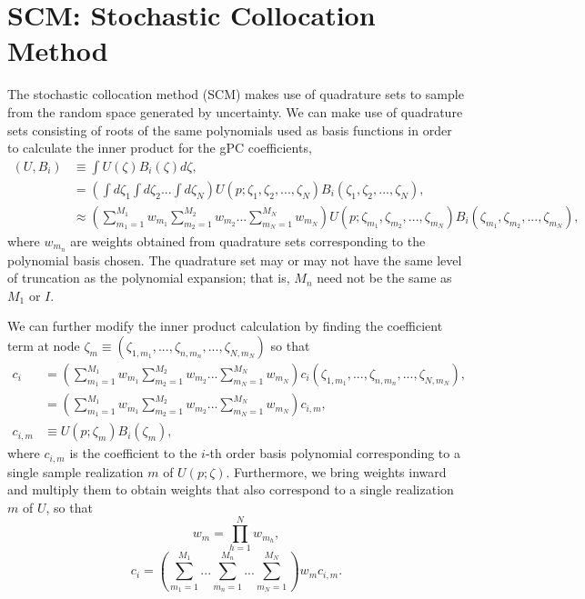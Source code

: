 \section{SCM: Stochastic Collocation Method}
The stochastic collocation method (SCM) makes use of quadrature sets to sample from the random space generated by uncertainty.  We can make use of quadrature sets consisting of roots of the same polynomials used as basis functions in order to calculate the inner product for the gPC coefficients,
\begin{align}
(U,B_i)&\equiv\int U(\zeta) B_i(\zeta)d\zeta, \\
  &=\left( \int d\zeta_1 \int d\zeta_2 ... \int d\zeta_N\right)
        U(p;\zeta_1,\zeta_2,...,\zeta_N)B_i(\zeta_1,\zeta_2,...,\zeta_N), \\
 &\approx\left(\sum_{m_1=1}^{M_1}w_{m_1}\sum_{m_2=1}^{M_2}w_{m_2}...\sum_{m_N=1}^{M_N}w_{m_N}\right)
        U(p;\zeta_{m_1},\zeta_{m_2},...,\zeta_{m_N})B_i(\zeta_{m_1},\zeta_{m_2},...,\zeta_{m_N}),
\end{align}
where $w_{m_n}$ are weights obtained from quadrature sets corresponding to the polynomial basis chosen.  The quadrature set may or may not have the same level of truncation as the polynomial expansion; that is, $M_n$ need not be the same as $M_1$ or $I$.

We can further modify the inner product calculation by finding the coefficient term at node $\zeta_m\equiv(\zeta_{1,m_1},...,\zeta_{n,m_n},...,\zeta_{N,m_N})$ so that
\begin{align}
c_i&=\left(\sum_{m_1=1}^{M_1}w_{m_1}\sum_{m_2=1}^{M_2}w_{m_2}...\sum_{m_N=1}^{M_N}w_{m_N}\right)
        c_i(\zeta_{1,m_1},...,\zeta_{n,m_n},...,\zeta_{N,m_N}),\\
  &= \left(\sum_{m_1=1}^{M_1}w_{m_1}\sum_{m_2=1}^{M_2}w_{m_2}...\sum_{m_N=1}^{M_N}w_{m_N}\right)
        c_{i,m},\\
c_{i,m}&\equiv U(p;\zeta_m)B_i(\zeta_m),
\end{align}
where $c_{i,m}$ is the coefficient to the $i$-th order basis polynomial corresponding to a single sample realization $m$ of $U(p;\zeta)$.  Furthermore, we bring weights inward and multiply them to obtain weights that also correspond to a single realization $m$ of $U$, so that
\begin{equation}
w_m=\prod_{h=1}^N w_{m_h},
\end{equation}
\begin{equation}
c_i=\left(\sum_{m_1=1}^{M_1}...\sum_{m_n=1}^{M_n}...\sum_{m_N=1}^{M_N}\right)w_m c_{i,m}.
\end{equation}

